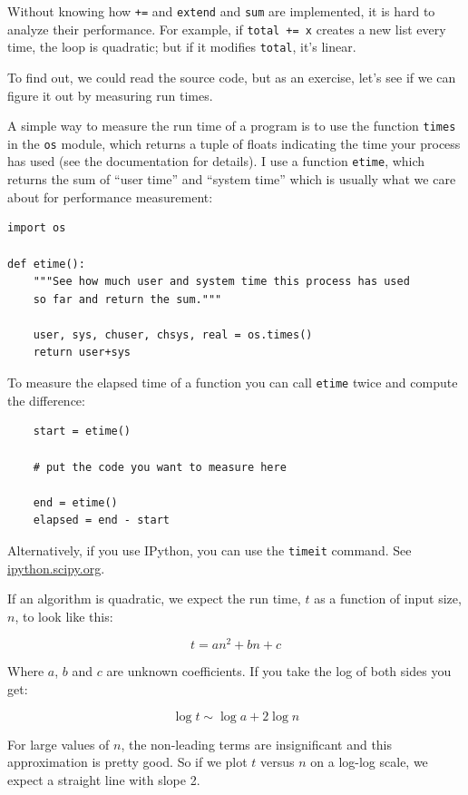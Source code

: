 \documentclass[10pt]{book}
\begin{document}
Without knowing how {\tt +=} and {\tt extend} and {\tt sum} are
implemented, it is hard to analyze their performance.  For example,
if {\tt total += x} creates a new list every time, the loop
is quadratic; but if it modifies {\tt total}, it's linear.

To find out, we could read the source code, but as an exercise, let's see
if we can figure it out by measuring run times.

A simple way to measure the run time of a program is to use
the function {\tt times} in the {\tt os} module, which returns
a tuple of floats indicating the time your process has used
(see the documentation for details).  I use a function {\tt etime},
which returns the sum of ``user time'' and ``system time'' which
is usually what we care about for performance measurement:

\begin{verbatim}
import os

def etime():
    """See how much user and system time this process has used
    so far and return the sum."""

    user, sys, chuser, chsys, real = os.times()
    return user+sys
\end{verbatim}

To measure the elapsed time of a function you can call
{\tt etime} twice and compute the difference:

\begin{verbatim}
    start = etime()

    # put the code you want to measure here

    end = etime()
    elapsed = end - start
\end{verbatim}

Alternatively, if you use IPython, you can use the
{\tt timeit} command. See \url{ipython.scipy.org}.

If an algorithm is quadratic, we expect the run time, $t$
as a function of input size, $n$, to look like this:

\[ t = a n^2 + b n + c \]

Where $a$, $b$ and $c$ are unknown coefficients.  If you take
the log of both sides you get:

\[ \log t \sim \log a + 2 \log n \]

For large values of $n$, the non-leading terms are insignificant
and this approximation is pretty good.  So if we plot $t$
versus $n$ on a log-log scale, we expect a straight line
with slope 2.
\end{document}
